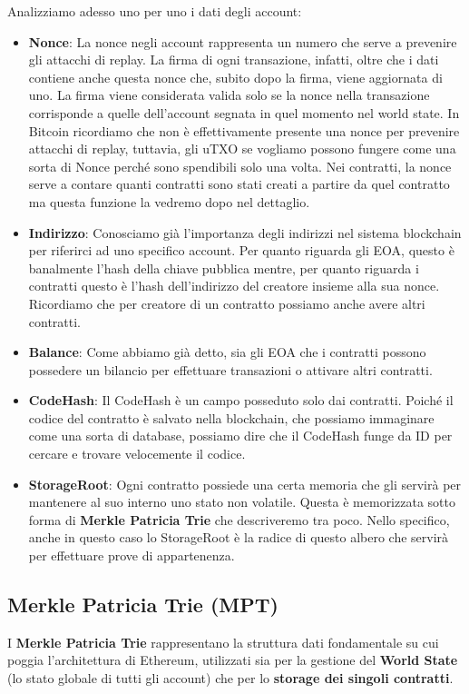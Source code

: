 Analizziamo adesso uno per uno i dati degli account:
\begin{itemize}
    \item \textbf{Nonce}: La nonce negli account rappresenta un numero che serve a prevenire gli attacchi di replay. La firma di ogni transazione, infatti, oltre che i dati contiene anche questa nonce che, subito dopo la firma, viene aggiornata di uno. La firma viene considerata valida solo se la nonce nella transazione corrisponde a quelle dell'account segnata in quel momento nel world state. In Bitcoin ricordiamo che non è effettivamente presente una nonce per prevenire attacchi di replay, tuttavia, gli uTXO se vogliamo possono fungere come una sorta di Nonce perché sono spendibili solo una volta. 
    Nei contratti, la nonce serve a contare quanti contratti sono stati creati a partire da quel contratto ma questa funzione la vedremo dopo nel dettaglio.
    \item \textbf{Indirizzo}: Conosciamo già l'importanza degli indirizzi nel sistema blockchain per riferirci ad uno specifico account. Per quanto riguarda gli EOA, questo è banalmente l'hash della chiave pubblica mentre, per quanto riguarda i contratti questo è l'hash dell'indirizzo del creatore insieme alla sua nonce. Ricordiamo che per creatore di un contratto possiamo anche avere altri contratti.
    \item \textbf{Balance}: Come abbiamo già detto, sia gli EOA che i contratti possono possedere un bilancio per effettuare transazioni o attivare altri contratti.
    \item \textbf{CodeHash}: Il CodeHash è un campo posseduto solo dai contratti. Poiché il codice del contratto è salvato nella blockchain, che possiamo immaginare come una sorta di database, possiamo dire che il CodeHash funge da ID per cercare e trovare velocemente il codice.
    \item \textbf{StorageRoot}: Ogni contratto possiede una certa memoria che gli servirà per mantenere al suo interno uno stato non volatile. Questa è memorizzata sotto forma di \textbf{Merkle Patricia Trie} che descriveremo tra poco. Nello specifico, anche in questo caso lo StorageRoot è la radice di questo albero che servirà per effettuare prove di appartenenza.
\end{itemize}


\subsection{Merkle Patricia Trie (MPT)}
I \textbf{Merkle Patricia Trie} rappresentano la struttura dati fondamentale su cui poggia l'architettura di Ethereum, utilizzati sia per la gestione del \textbf{World State} (lo stato globale di tutti gli account) che per lo \textbf{storage dei singoli contratti}.

